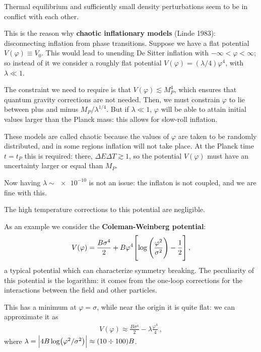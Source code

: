 \documentclass[main.tex]{subfiles}
\begin{document}
Thermal equilibrium and sufficiently small density perturbations seem to be in conflict with each other. 

This is the reason why \textbf{chaotic inflationary models} (Linde 1983): disconnecting inflation from phase transitions. 
Suppose we have a flat potential \(V(\varphi ) \equiv V_0 \). 
This would lead to unending De Sitter inflation with \(- \infty < \varphi < \infty \); so instead of it we consider a roughly flat potential \(V(\varphi ) = (\lambda /4) \varphi^{4}\), with \(\lambda \ll 1\). 

The constraint we need to require is that \(V(\varphi ) \lesssim M_P^{4}\), which ensures that quantum gravity corrections are not needed.
Then, we must constrain \(\varphi \) to lie between plus and minus \(M_P / \lambda^{1/4}\). 
But if \(\lambda \ll 1\), \(\varphi \) will be able to attain initial values larger than the Planck mass: this allows for slow-roll inflation. 

These models are called chaotic because the values of \(\varphi \) are taken to be randomly distributed, and in some regions inflation will not take place. 
At the Planck time \(t = t_P\) this is required: there, \(\Delta E \Delta T \gtrsim 1\), so the potential \(V(\varphi )\) must have an uncertainty larger or equal than \(M_P\). 

Now having \(\lambda \sim \num{e-10}\) is not an issue: the inflaton is not coupled, and we are fine with this. 

The high temperature corrections to this potential are negligible.

As an example we consider the \textbf{Coleman-Weinberg potential}: 
%
\begin{align}
V(\varphi ) = \frac{B \sigma^{4}}{2}
+ B \varphi^{4} \qty[\log \qty(\frac{\varphi^2}{\sigma^2}) - \frac{1}{2}]
\,,
\end{align}
%
a typical potential which can characterize symmetry breaking. 
The peculiarity of this potential is the logarithm: it comes from the one-loop corrections for the interactions between the field and other particles. 

This has a minimum at \(\varphi = \sigma \), while near the origin it is quite flat: we can approximate it as 
%
\begin{align}
V(\varphi ) \approx \frac{B \sigma^{4}}{2} - \lambda \frac{\varphi^{4}}{4} 
\,,
\end{align}
%
where \(\lambda = \abs{4 B \log (\varphi^2 / \sigma^2)} \approx \qty(\num{10} \divisionsymbol \num{100}) B\). 
\end{document}
